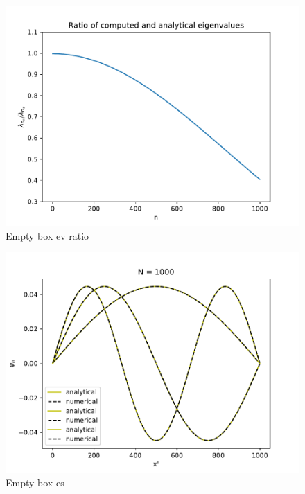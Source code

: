 \documentclass{article}
\begin{document}
\begin{figure}
    \includegraphics[width=\linewidth]{./media/eigenval_ratio_empty_box.pdf}
    \caption{Empty box ev ratio}
    \label{fig:box-eigenvals-ratio}
\end{figure}

\begin{figure}
    \includegraphics[width=\linewidth]{./media/eigenstates_empty_box.pdf}
    \caption{Empty box es}
    \label{fig:box-eigenstates}
\end{figure}
\end{document}
